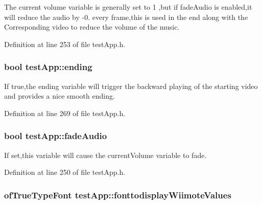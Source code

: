 The current volume variable is generally set to 1 ,but if fade\-Audio is enabled,it will reduce the audio by -\/0. every frame,this is used in the end along with the Corresponding video to reduce the volume of the music. 



Definition at line 253 of file test\-App.\-h.

\hypertarget{classtest_app_acf09303bc452d2a38098f6bf94655408}{
\subsubsection[{ending}]{\setlength{\rightskip}{0pt plus 5cm}bool test\-App\-::ending}}\label{classtest_app_acf09303bc452d2a38098f6bf94655408}


If true,the ending variable will trigger the backward playing of the starting video and provides a nice smooth ending. 



Definition at line 269 of file test\-App.\-h.

\hypertarget{classtest_app_a918c09b5a4389a8402cfacb25d390226}{
\subsubsection[{fade\-Audio}]{\setlength{\rightskip}{0pt plus 5cm}bool test\-App\-::fade\-Audio}}\label{classtest_app_a918c09b5a4389a8402cfacb25d390226}


If set,this variable will cause the current\-Volume variable to fade. 



Definition at line 250 of file test\-App.\-h.

\hypertarget{classtest_app_ab336e228840f001d15f9b1eb3a30972f}{
\subsubsection[{fonttodisplay\-Wiimote\-Values}]{\setlength{\rightskip}{0pt plus 5cm}of\-True\-Type\-Font test\-App\-::fonttodisplay\-Wiimote\-Values}}\label{classtest_app_ab336e228840f001d15f9b1eb3a30972f}


